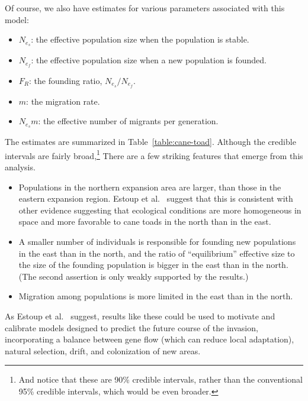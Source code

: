 Of course, we also have estimates for various parameters associated
with this model: 

\begin{itemize}

\item $N_{e_s}$: the effective population size when the population is
  stable.

\item $N_{e_f}$: the effective population size when a new population
  is founded.

\item $F_R$: the founding ratio, $N_{e_s}/N_{e_f}$.

\item $m$: the migration rate.

\item $N_{e_s}m$: the effective number of migrants per generation.

\end{itemize}

The estimates are summarized in Table~\ref{table:cane-toad}. Although
the credible intervals are fairly broad,\footnote{And notice that
  these are 90\% credible intervals, rather than the conventional 95\%
  credible intervals, which would be even broader.} There are a few
striking features that emerge from this analysis.

\begin{itemize}

\item Populations in the northern expansion area are larger, than
  those in the eastern expansion region. Estoup et
  al.~\cite{Estoup-etal-2004} suggest that this is consistent with
  other evidence suggesting that ecological conditions are more
  homogeneous in space and more favorable to cane toads in the north
  than in the east.

\item A smaller number of individuals is responsible for founding new
  populations in the east than in the north, and the ratio of
  ``equilibrium'' effective size to the size of the founding
  population is bigger in the east than in the north. (The second
  assertion is only weakly supported by the results.)

\item Migration among populations is more limited in the east than in
  the north. 

\end{itemize}

As Estoup et al.~\cite{Estoup-etal-2004} suggest, results like these
could be used to motivate and calibrate models designed to predict the
future course of the invasion, incorporating a balance between gene
flow (which can reduce local adaptation), natural selection, drift,
and colonization of new areas.

